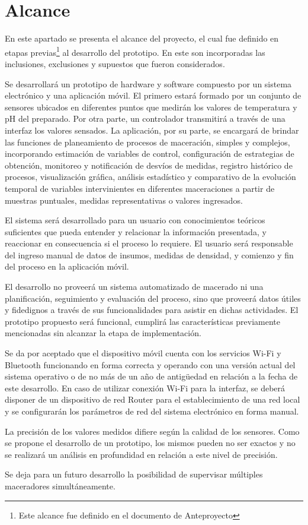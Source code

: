 \section{Alcance}
    \par
    En este apartado se presenta el alcance del proyecto, el cual fue definido en etapas previas\footnote{Este alcance fue definido en el documento de Anteproyecto} al desarrollo del prototipo. En este son incorporadas las inclusiones, exclusiones y supuestos que fueron considerados.
    \par
    Se desarrollará un prototipo de hardware y software compuesto por un sistema electrónico y una aplicación móvil. El primero estará formado por un conjunto de sensores ubicados en diferentes puntos que medirán los valores de temperatura y pH del preparado. Por otra parte, un controlador transmitirá a través de una interfaz los valores sensados. La aplicación, por su parte, se encargará de brindar las funciones de planeamiento de procesos de maceración, simples y complejos, incorporando estimación de variables de control, configuración de estrategias de obtención, monitoreo y notificación de desvíos de medidas, registro histórico de procesos, visualización gráfica, análisis estadístico y comparativo de la evolución temporal de variables intervinientes en diferentes maceraciones a partir de muestras puntuales, medidas representativas o valores ingresados.
    \par
    El sistema será desarrollado para un usuario con conocimientos teóricos suficientes que pueda entender y relacionar la información presentada, y reaccionar en consecuencia si el proceso lo requiere. El usuario será responsable del ingreso manual de datos de insumos, medidas de densidad, y comienzo y fin del proceso en la aplicación móvil.
    \par
    El desarrollo no proveerá un sistema automatizado de macerado ni una planificación, seguimiento y evaluación del proceso, sino que proveerá datos útiles y fidedignos a través de sus funcionalidades para asistir en dichas actividades. El prototipo propuesto será funcional, cumplirá las características previamente mencionadas sin alcanzar la etapa de implementación.
    \par
    Se da por aceptado que el dispositivo móvil cuenta con los servicios Wi-Fi y Bluetooth funcionando en forma correcta y operando con una versión actual del sistema operativo o de no más de un año de antigüedad en relación a la fecha de este desarrollo. En caso de utilizar conexión Wi-Fi para la interfaz, se deberá disponer de un dispositivo de red Router para el establecimiento de una red local y se configurarán los parámetros de red del sistema electrónico en forma manual.
    \par
    La precisión de los valores medidos difiere según la calidad de los sensores. Como se propone el desarrollo de un prototipo, los mismos pueden no ser exactos y no se realizará un análisis en profundidad en relación a este nivel de precisión. 
    \par
    Se deja para un futuro desarrollo la posibilidad de supervisar múltiples maceradores simultáneamente. 
 
